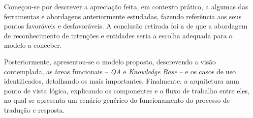 Começou-se por descrever a apreciação feita, em contexto prático, a algumas das ferramentas e abordagens anteriormente estudadas, fazendo referência aos seus pontos favoráveis e desfavoráveis. A conclusão retirada foi a de que a abordagem de reconhecimento de intenções e entidades seria a escolha adequada para o modelo a conceber.

Posteriormente, apresentou-se o modelo proposto, descrevendo a visão contemplada, as áreas funcionais -- \textit{QA} e \textit{Knowledge Base} -- e os casos de uso identificados, detalhando os mais importantes. Finalmente, a arquitetura num ponto de vista lógica, explicando os componentes e o fluxo de trabalho entre eles, no qual se apresenta um cenário genérico do funcionamento do processo de tradução e resposta.
